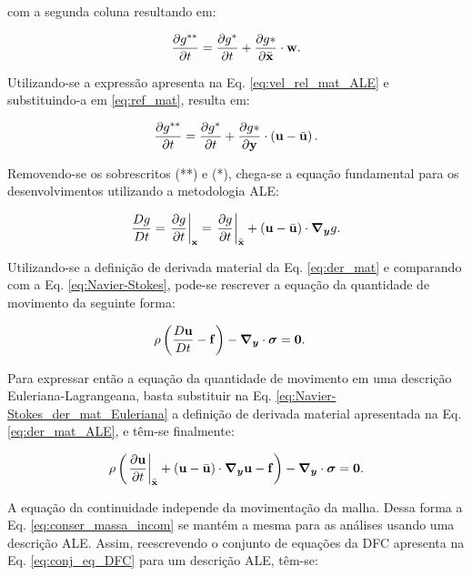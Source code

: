 \documentclass[tese_patricia]{subfiles}%
\begin{document}
\noindent com a segunda coluna resultando em:

\begin{align}
	\frac{\partial g^{**}}{\partial t} = \frac{\partial g^*}{\partial t} + \frac{\partial g*}{\partial \bar{\mathbf{x}}} \cdot \mathbf{w}. \label{eq:ref_mat}
\end{align}

Utilizando-se a expressão apresenta na Eq. \ref{eq:vel_rel_mat_ALE} e substituindo-a em \ref{eq:ref_mat}, resulta em:

\begin{align}
	\frac{\partial g^{**}}{\partial t} = \frac{\partial g^*}{\partial t} + \frac{\partial g*}{\partial \mathbf{y}} \cdot \left(\mathbf{u} - \bar{\mathbf{u}} \right). 
\end{align}

Removendo-se os sobrescritos (**) e (*), chega-se a equação fundamental para os desenvolvimentos utilizando a metodologia ALE:

\begin{align}
	\frac{Dg}{Dt} = \left . \frac{\partial g}{\partial t} \right|_{\mathbf{x}} = \left . \frac{\partial g}{\partial t} \right|_{\bar{\mathbf{x}}} + \left(\mathbf{u} - \bar{\mathbf{u}} \right) \cdot \boldsymbol{\nabla_y} g. \label{eq:der_mat_ALE}
\end{align}

Utilizando-se a definição de derivada material da Eq. \ref{eq:der_mat} e comparando com a Eq. \ref{eq:Navier-Stokes}, pode-se rescrever a equação da quantidade de movimento da seguinte forma:

\begin{align}
	\rho\left(\frac{D\mathbf{u}}{Dt} - \mathbf{f} \right) - \boldsymbol{\nabla_y} \cdot \boldsymbol{\sigma} &= \mathbf{0}. \label{eq:Navier-Stokes_der_mat_Euleriana}
\end{align}

Para expressar então a equação da quantidade de movimento em uma descrição Euleriana-Lagrangeana, basta substituir na Eq. \ref{eq:Navier-Stokes_der_mat_Euleriana} a definição de derivada material apresentada na Eq. \ref{eq:der_mat_ALE}, e têm-se finalmente:

\begin{align}
	\rho\left(\left. \frac{\partial\mathbf{u}}{\partial t} \right|_{\bar{\mathbf{x}}} + \left(\mathbf{u} - \bar{\mathbf{u}} \right) \cdot \boldsymbol{\nabla_y}  \mathbf{u}  - \mathbf{f} \right) - \boldsymbol{\nabla_y} \cdot \boldsymbol{\sigma} = \mathbf{0}. \label{eq:Navier-Stokes_ALE} 
\end{align}

A equação da continuidade independe da movimentação da malha. Dessa forma a Eq. \ref{eq:conser_massa_incom} se mantém a mesma para as análises usando uma descrição ALE. Assim, reescrevendo o conjunto de equações da DFC apresenta na Eq. \ref{eq:conj_eq_DFC} para um descrição ALE, têm-se:
\end{document}
